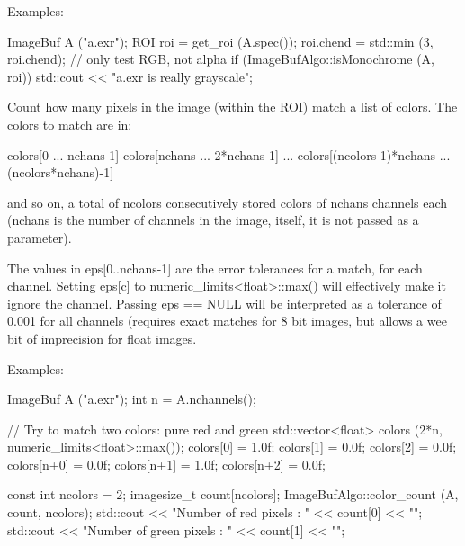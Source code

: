 \smallskip
\noindent Examples:
\begin{code}
    ImageBuf A ("a.exr");
    ROI roi = get_roi (A.spec());
    roi.chend = std::min (3, roi.chend);  // only test RGB, not alpha
    if (ImageBufAlgo::isMonochrome (A, roi))
        std::cout << "a.exr is really grayscale\n";
\end{code}
\apiend


 

Count how many pixels in the image (within the ROI) match a list of colors.
The colors to match are in:

\begin{code}
  colors[0 ... nchans-1]
  colors[nchans ... 2*nchans-1]
  ...
  colors[(ncolors-1)*nchans ... (ncolors*nchans)-1]
\end{code}

\noindent and so on, a total of {\cf ncolors} consecutively stored
colors of {\cf nchans} channels each ({\cf nchans} is the number of
channels in the image, itself, it is not passed as a parameter).


The values in {\cf eps[0..nchans-1]} are the error tolerances for a
match, for each channel.  Setting {\cf eps[c]} to 
{\cf numeric_limits<float>::max()} will effectively make it ignore the
channel.  Passing {\cf eps == NULL} will be interpreted as a tolerance
of 0.001 for all channels (requires exact matches for 8 bit images, but
allows a wee bit of imprecision for {\cf float} images.

\smallskip
\noindent Examples:
\begin{code}
    ImageBuf A ("a.exr");
    int n = A.nchannels();

    // Try to match two colors: pure red and green
    std::vector<float> colors (2*n, numeric_limits<float>::max());
    colors[0] = 1.0f; colors[1] = 0.0f; colors[2] = 0.0f;
    colors[n+0] = 0.0f; colors[n+1] = 1.0f; colors[n+2] = 0.0f;

    const int ncolors = 2;
    imagesize_t count[ncolors];
    ImageBufAlgo::color_count (A, count, ncolors);
    std::cout << "Number of red pixels   : " << count[0] << "\n";
    std::cout << "Number of green pixels : " << count[1] << "\n";
\end{code}
\apiend


